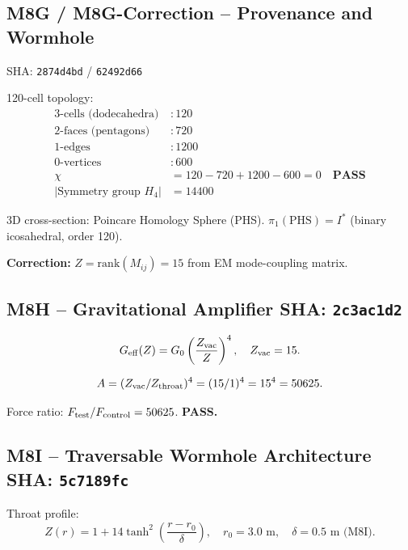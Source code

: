 \documentclass[12pt,letterpaper]{article}
\begin{document}
\subsection{M8G / M8G-Correction -- Provenance and Wormhole}
\hfill SHA: \texttt{2874d4bd} / \texttt{62492d66}

120-cell topology:
\begin{align}
  \text{3-cells (dodecahedra)} &: 120 \\
  \text{2-faces (pentagons)}   &: 720 \\
  \text{1-edges}               &: 1200 \\
  \text{0-vertices}            &: 600 \\
  \chi &= 120 - 720 + 1200 - 600 = 0 \quad\textbf{PASS}\\
  |\text{Symmetry group }H_4|  &= 14400
\end{align}

3D cross-section: Poincare Homology Sphere (PHS).
$\pi_1(\mathrm{PHS}) = I^*$ (binary icosahedral, order 120).

\textbf{Correction:} $Z = \mathrm{rank}(M_{ij}) = 15$ from EM mode-coupling matrix.

\subsection{M8H -- Gravitational Amplifier \hfill SHA: \texttt{2c3ac1d2}}

\begin{equation}
  G_{\rm eff}(Z) = G_0 \left(\frac{Z_{\rm vac}}{Z}\right)^4,
  \quad Z_{\rm vac} = 15.
  \label{eq:Geff}
\end{equation}

\begin{equation}
  A = (Z_{\rm vac}/Z_{\rm throat})^4 = (15/1)^4 = 15^4 = 50625.
  \label{eq:Aamp}
\end{equation}

Force ratio: $F_{\rm test}/F_{\rm control} = 50625$. \textbf{PASS.}

\subsection{M8I -- Traversable Wormhole Architecture \hfill SHA: \texttt{5c7189fc}}

Throat profile:
\begin{equation}
  Z(r) = 1 + 14\tanh^2\!\left(\frac{r - r_0}{\delta}\right),
  \quad r_0 = 3.0 \text{ m},\quad \delta = 0.5 \text{ m (M8I)}.
  \label{eq:Zr}
\end{equation}
\end{document}
